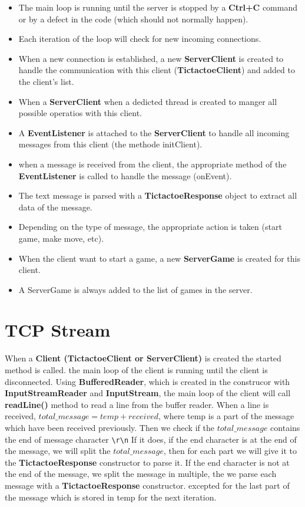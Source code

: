 \documentclass[11pt]{article}
\begin{document}
\begin{itemize}
    \item The main loop is running until the server is stopped by a \textbf{Ctrl+C} command or by a defect in the code (which should not normally happen).
    \item Each iteration of the loop will check for new incoming connections.
    \item When a new connection is established, a new \textbf{ServerClient} is created to handle the communication with this client (\textbf{TictactoeClient}) and added to the client's list.
    \item When a \textbf{ServerClient} when a dedicted thread is created to manger all possible operatios with this client.
    \item A \textbf{EventListener} is attached to the \textbf{ServerClient} to handle all incoming messages from this client (the methode initClient).
    \item when a message is received from the client, the appropriate method of the \textbf{EventListener} is called to handle the message (onEvent).
    \item The text message is parsed with a \textbf{TictactoeResponse} object to extract all data of the message.
    \item Depending on the type of message, the appropriate action is taken (start game, make move, etc).
    \item When the client want to start a game, a new \textbf{ServerGame} is created for this client.
    \item A ServerGame is always added to the list of games in the server.
\end{itemize}


\section{TCP Stream}
When a \textbf{Client (TictactoeClient or ServerClient)} is created the started method is called.
the main loop of the client is running until the client is disconnected. Using \textbf{BufferedReader}, 
which is created in the construcor with \textbf{InputStreamReader} and \textbf{InputStream}, the main loop
of the client will call \textbf{readLine()} method to read a line from the buffer reader.
When a line is received, $total\_message = temp + received$, where temp is a part of the message which have been received previously.
Then we check if the $total\_message$ contains the end of message character \texttt{\textbackslash r\textbackslash n} If it does, if the end character is at the end of the message,
we will split the $total\_message$, then for each part we will give it to the \textbf{TictactoeResponse} constructor to parse it.
If the end character is not at the end of the message, we split the message in multiple, the we parse each message with a \textbf{TictactoeResponse} constructor.
excepted for the last part of the message which is stored in temp for the next iteration.
\vspace{10px}
\end{document}
